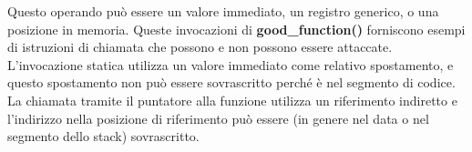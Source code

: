 Questo operando può essere un valore immediato, un registro generico, o una posizione
in memoria. Queste invocazioni di \textbf{good\_function()} forniscono esempi di
istruzioni di chiamata che possono e non possono essere attaccate. L'invocazione
statica utilizza un valore immediato come relativo spostamento, e questo spostamento
non può essere sovrascritto perché è nel segmento di codice. La chiamata tramite il
puntatore alla funzione utilizza un riferimento indiretto e l'indirizzo nella posizione
di riferimento può essere (in genere nel data o nel segmento dello stack) sovrascritto.
